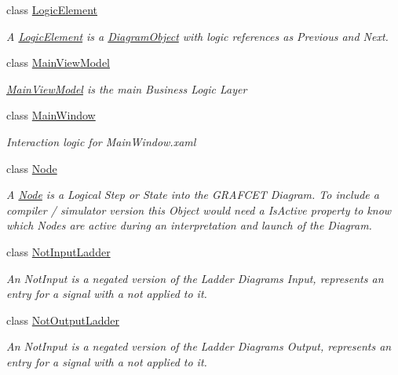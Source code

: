 \begin{DoxyCompactItemize}
class \hyperlink{class_prototipo_t_f_g_1_1_logic_element}{Logic\+Element}
\begin{DoxyCompactList}\small\item\em A \hyperlink{class_prototipo_t_f_g_1_1_logic_element}{Logic\+Element} is a \hyperlink{class_prototipo_t_f_g_1_1_diagram_object}{Diagram\+Object} with logic references as Previous and Next. \end{DoxyCompactList}\item 
class \hyperlink{class_prototipo_t_f_g_1_1_main_view_model}{Main\+View\+Model}
\begin{DoxyCompactList}\small\item\em \hyperlink{class_prototipo_t_f_g_1_1_main_view_model}{Main\+View\+Model} is the main Business Logic Layer \end{DoxyCompactList}\item 
class \hyperlink{class_prototipo_t_f_g_1_1_main_window}{Main\+Window}
\begin{DoxyCompactList}\small\item\em Interaction logic for Main\+Window.\+xaml \end{DoxyCompactList}\item 
class \hyperlink{class_prototipo_t_f_g_1_1_node}{Node}
\begin{DoxyCompactList}\small\item\em A \hyperlink{class_prototipo_t_f_g_1_1_node}{Node} is a Logical Step or State into the G\+R\+A\+F\+C\+E\+T Diagram. To include a compiler / simulator version this Object would need a \textquotesingle{}Is\+Active\textquotesingle{} property to know which Nodes are active during an interpretation and launch of the Diagram. \end{DoxyCompactList}\item 
class \hyperlink{class_prototipo_t_f_g_1_1_not_input_ladder}{Not\+Input\+Ladder}
\begin{DoxyCompactList}\small\item\em An Not\+Input is a negated version of the Ladder Diagram\textquotesingle{}s Input, represents an entry for a signal with a \textquotesingle{}not\textquotesingle{} applied to it. \end{DoxyCompactList}\item 
class \hyperlink{class_prototipo_t_f_g_1_1_not_output_ladder}{Not\+Output\+Ladder}
\begin{DoxyCompactList}\small\item\em An Not\+Input is a negated version of the Ladder Diagram\textquotesingle{}s Output, represents an entry for a signal with a \textquotesingle{}not\textquotesingle{} applied to it. \end{DoxyCompactList}\item 

\end{DoxyCompactItemize}
